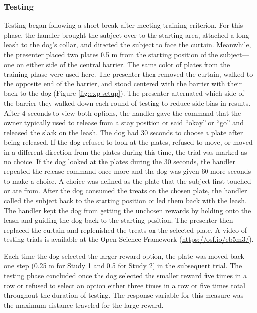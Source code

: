 \documentclass[
  pub,floatsintext]{apa6}
\begin{document}
\hypertarget{testing}{%
\subsubsection{Testing}\label{testing}}

Testing began following a short break after meeting training criterion. For this phase, the handler brought the subject over to the starting area, attached a long leash to the dog's collar, and directed the subject to face the curtain. Meanwhile, the presenter placed two plates 0.5 m from the starting position of the subject---one on either side of the central barrier. The same color of plates from the training phase were used here. The presenter then removed the curtain, walked to the opposite end of the barrier, and stood centered with the barrier with their back to the dog (Figure \ref{fig:exp-setup}). The presenter alternated which side of the barrier they walked down each round of testing to reduce side bias in results. After 4 seconds to view both options, the handler gave the command that the owner typically used to release from a stay position or said ``okay'' or ``go'' and released the slack on the leash. The dog had 30 seconds to choose a plate after being released. If the dog refused to look at the plates, refused to move, or moved in a different direction from the plates during this time, the trial was marked as no choice. If the dog looked at the plates during the 30 seconds, the handler repeated the release command once more and the dog was given 60 more seconds to make a choice. A choice was defined as the plate that the subject first touched or ate from. After the dog consumed the treats on the chosen plate, the handler called the subject back to the starting position or led them back with the leash. The handler kept the dog from getting the unchosen rewards by holding onto the leash and guiding the dog back to the starting position. The presenter then replaced the curtain and replenished the treats on the selected plate. A video of testing trials is available at the Open Science Framework (\url{https://osf.io/eb5m3/}).

Each time the dog selected the larger reward option, the plate was moved back one step (0.25 m for Study 1 and 0.5 for Study 2) in the subsequent trial. The testing phase concluded once the dog selected the smaller reward five times in a row or refused to select an option either three times in a row or five times total throughout the duration of testing. The response variable for this measure was the maximum distance traveled for the large reward.
\end{document}
